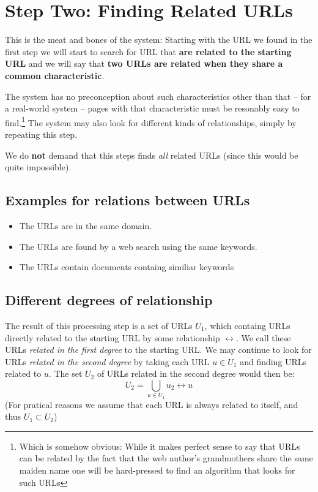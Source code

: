 \documentclass[a4paper]{danarticle}
\begin{document}
  \section*{Step Two: Finding Related URLs}
     This is the meat and bones of the system: Starting with the
     URL we found in the first step we will start to search for
     URL that \textbf{are related to the starting URL}
     and we will say that
     \textbf{two URLs are related when they share a common
     characteristic}. 
     
     The system has no preconception about such characteristics other
     than that -- for a real-world system -- pages with that 
     characteristic must be resonably easy to 
     find.\footnote{Which is somehow
     obvious: While it makes perfect sense to say that URLs can
     be related by the fact that the web author's grandmothers share
     the same maiden name one will be hard-pressed to find an
     algorithm that looks for such URLs} The system may also
     look for different kinds of relationships, simply by
     repeating this step.
     
     We do \textbf{not} demand that this steps finds \textit{all}
     related URLs (since this would be quite impossible).
     
     \subsection*{Examples for relations between URLs}
       \begin{itemize}
         \item{The URLs are in the same domain.}
         \item{The URLs are found by a web search using the same keywords.}
         \item{The URLs contain documents containg similiar keywords}
       \end{itemize}
     
     \subsection*{Different degrees of relationship}
       The result of this processing step is a set of URLs $ U_{1} $,
       which containg URLs directly related to the starting
       URL by some relationship $ \leftrightarrow $. 
       We call these URLs \textit{related in the
       first degree} to the starting URL.
       We may continue to look for URLs \textit{related in the second
       degree} by taking each URL $ u \in U_1 $ and finding URLs related
       to $ u $. The set $ U_2 $ of URLs related in the second degree would
       then be:
       \[
        U_2 = \bigcup_{u \in U_1} u_2 \leftrightarrow u
       \]
       (For pratical reasons we assume that each URL is always related
       to itself, and thus $ U_1 \subset U_2 $)
       
\end{document}

